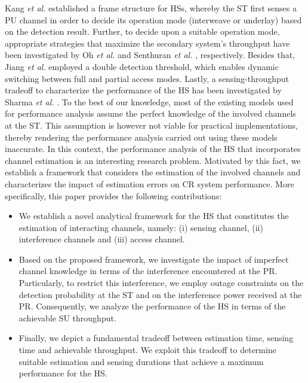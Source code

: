 Kang \textit{et al.} \cite{Kang09} established a frame structure for HSs, whereby the ST first senses a PU channel in order to decide its operation mode (interweave or underlay) based on the detection result. Further, to decide upon a suitable operation mode, appropriate strategies that maximize the secondary system's throughput have been investigated by Oh \textit{et al.} \cite{Oh10} and Senthuran \textit{et al.} \cite{Senthu12}, respectively. Besides that, Jiang \textit{et al.} employed a double detection threshold, which enables dynamic switching between full and partial access modes. Lastly, a sensing-throughput tradeoff to characterize the performance of the HS has been investigated by Sharma \textit{et al.} \cite{Sharma14}. 
To the best of our knowledge, most of the existing models used for performance analysis assume the perfect knowledge of the involved channels at the ST. This assumption is however not viable for practical implementations, thereby rendering the performance analysis carried out using these models inaccurate. In this context, the performance analysis of the HS that incorporates channel estimation is an interesting research problem. Motivated by this fact, we establish a framework that considers the estimation of the involved channels and characterizes the impact of estimation errors on CR system performance.
More specifically, this paper provides the following contributions:
\begin{itemize}
\item 
We establish a novel analytical framework for the HS that constitutes the estimation of interacting channels, namely: (i) sensing channel, (ii) interference channels and (iii) access channel.
\item
Based on the proposed framework, we investigate the impact of imperfect channel knowledge in terms of the interference encountered at the PR. Particularly, to restrict this interference, we employ outage constraints on the detection probability at the ST and on the interference power received at the PR. Consequently, we analyze the performance of the HS in terms of the achievable SU throughput.
\item 
Finally, we depict a fundamental tradeoff between estimation time, sensing time and achievable throughput. We exploit this tradeoff to determine suitable estimation and sensing durations that achieve a maximum performance for the HS. 
\end{itemize}

